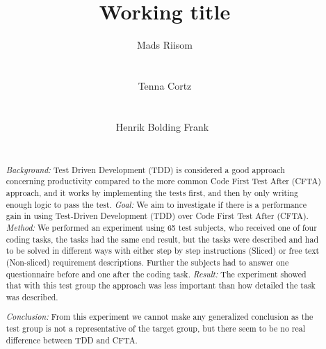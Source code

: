 \documentclass{sig-alternate-05-2015}
\begin{document}
	




\title{Working title}

\author{
\alignauthor
	Mads Riisom\\
	\\
	\\
\alignauthor
	Tenna Cortz\\
	\\
	\\
\alignauthor
	Henrik Bolding Frank\
	\\
	\\
}

\maketitle
\begin{abstract}
\textit{Background:} Test Driven Development (TDD) is considered a good approach concerning productivity compared to the more common Code First Test After (CFTA) approach, and it works by implementing the tests first, and then by only writing enough logic to pass the test. \textit{Goal:} We aim to investigate if there is a performance gain in using Test-Driven Development (TDD) over Code First Test After (CFTA). \textit{Method:} We performed an experiment using 65 test subjects, who received one of four coding tasks, the tasks had the same end result, but the tasks were described and had to be solved in different ways with either step by step instructions (Sliced) or free text (Non-sliced) requirement descriptions. Further the subjects had to answer one questionnaire before and one after the coding task. \textit{Result:} The experiment showed that with this test group the approach was less important than how detailed the task was described.

\textit{Conclusion:} From this experiment we cannot make any generalized conclusion as the test group is not a representative of the target group, but there seem to be no real difference between TDD and CFTA.

\end{abstract}
\end{document}
